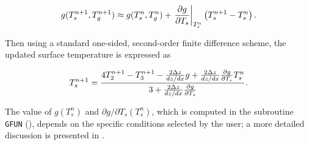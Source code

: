 \begin{equation}
g(T_s^{n+1},T_g^{n+1})\approx g(T_s^n,T_g^n) +
\left. {\partial g \over \partial T_s}\right|_{T_s^n}\left(T_s^{n+1}-T_s^n\right).
\end{equation}

Then using a standard one-sided, second-order finite difference scheme, the updated surface temperature is expressed as

\begin{equation}
T_s^{n+1}=\frac{ 4T_2^{n+1} - T_3^{n+1} - {2 \Delta z \over dz/dx}g
 + {2 \Delta z \over dz/dx} {\partial g \over \partial T_s} T_s^{n}}
{3 + {2 \Delta z \over dz/dx} {\partial g \over \partial T_s} }.
\end{equation}

The value of $g(T_s^n)$ and $\partial g/\partial T_s(T_s^n)$, which is computed in the subroutine \texttt{GFUN} (), depends on the specific conditions selected by the user; a more detailed discussion is presented in .